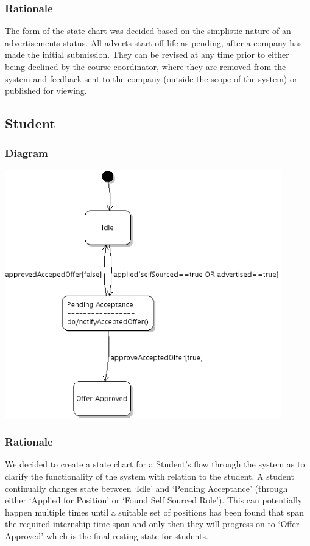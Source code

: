 \documentclass[11pt]{l3deliverable}
\begin{document}
\subsubsection{Rationale}

The form of the state chart was decided based on the simplistic nature of an 
advertisements status. All adverts start off life as pending, after a company
has made the initial submission. They can be
revised at any time prior to either being declined by the course
coordinator, where they are removed from the system and feedback sent
to the company (outside the scope of the system) or published for viewing.

\subsection{Student}

\subsubsection{Diagram}

\includegraphics[width=0.9\textwidth]{studentState.png}

\subsubsection{Rationale}

We decided to create a state chart for a Student's flow through the
system as to clarify the functionality of the system with relation to
the student. A student continually changes state between `Idle' and `Pending
Acceptance' (through either `Applied for Position' or `Found Self
Sourced Role'). This can potentially happen multiple times until a suitable 
set of positions has been found that span the required internship time span and 
only then they will progress on to `Offer Approved' which is the final resting 
state for students.
\end{document}
